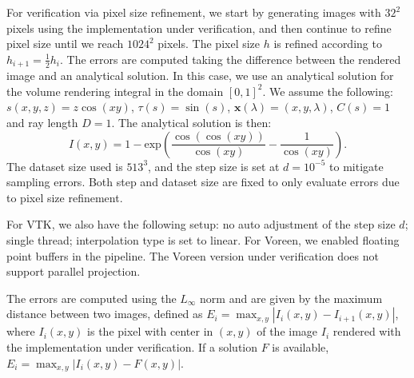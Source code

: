 For verification via pixel size refinement, we start by generating
images with $32^2$ pixels using the implementation under verification,
and then continue to refine pixel size until we reach $1024^2$
pixels. The pixel size $h$ is refined according to $h_{i+1} =
\frac{1}{2} h_i$. The errors are computed taking the difference
between the rendered image and an analytical solution. In this case,
we use an analytical solution for the volume rendering integral in the
domain $[0,1]^2$. We assume the following: $s(x,y,z) = z \cos(xy)$,
$\tau(s) = \sin(s)$, $\textbf{x}(\lambda) = (x, y, \lambda)$, $C(s)
= 1$ and ray length $D = 1$. The analytical solution is then:
\begin{equation}
I(x,y) = 1-\mathrm{exp}{\left(\frac{\cos(\cos(xy))}{\cos(xy)}-\frac{1}{\cos(xy)}\right)}.
\end{equation}
The dataset size used is $513^3$, and the step size is set at $d =
10^{-5}$ to mitigate sampling errors. Both step and dataset size are
fixed to only evaluate errors due to pixel size refinement.

For VTK, we also have the following setup: no auto adjustment of the step
size $d$; single thread; interpolation type is set to linear. 
For Voreen, we enabled floating
point buffers in the pipeline. The Voreen version under verification
does not support parallel projection.

The errors are computed using the $L_\infty$ norm and are given by the
maximum distance between two images, defined as $E_i = \max_{x,y} |
I_{i}(x,y) - I_{i+1}(x,y)|$, where $I_{i}(x,y)$ is the pixel with
center in $(x,y)$ of the image $I_i$ rendered with the implementation
under verification. If a solution $F$ is available, $E_i = \max_{x,y}
| I_{i}(x,y) - F(x,y)|$. 

